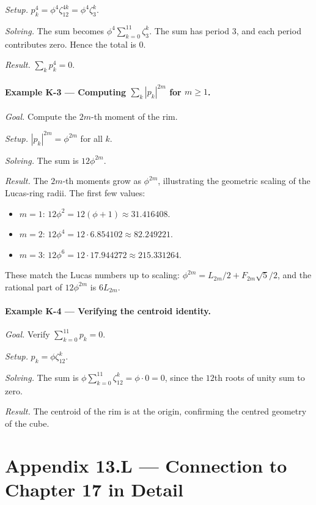\emph{Setup.} $p_{k}^{4} = \phi^{4} \zeta_{12}^{4k} = \phi^{4}
\zeta_{3}^{k}$.

\emph{Solving.} The sum becomes
$\phi^{4} \sum_{k=0}^{11} \zeta_{3}^{k}$. The sum has period $3$,
and each period contributes zero. Hence the total is $0$.

\emph{Result.} $\sum_{k} p_{k}^{4} = 0$.

\paragraph{Example K-3 --- Computing $\sum_{k} |p_{k}|^{2 m}$
for $m \geq 1$.}
\emph{Goal.} Compute the $2m$-th moment of the rim.

\emph{Setup.} $|p_{k}|^{2m} = \phi^{2m}$ for all $k$.

\emph{Solving.} The sum is $12 \phi^{2m}$.

\emph{Result.} The $2m$-th moments grow as $\phi^{2m}$, illustrating
the geometric scaling of the Lucas-ring radii. The first few
values:
\begin{itemize}
\item $m = 1$: $12 \phi^{2} = 12(\phi + 1) \approx 31.416408$.
\item $m = 2$: $12 \phi^{4} = 12 \cdot 6.854102 \approx 82.249221$.
\item $m = 3$: $12 \phi^{6} = 12 \cdot 17.944272 \approx 215.331264$.
\end{itemize}
These match the Lucas numbers up to scaling: $\phi^{2m} =
L_{2m}/2 + F_{2m}\sqrt{5}/2$, and the rational part of $12 \phi^{2m}$
is $6 L_{2m}$.

\paragraph{Example K-4 --- Verifying the centroid identity.}
\emph{Goal.} Verify $\sum_{k=0}^{11} p_{k} = 0$.

\emph{Setup.} $p_{k} = \phi \zeta_{12}^{k}$.

\emph{Solving.} The sum is $\phi \sum_{k=0}^{11} \zeta_{12}^{k} =
\phi \cdot 0 = 0$, since the $12$th roots of unity sum to zero.

\emph{Result.} The centroid of the rim is at the origin, confirming
the centred geometry of the cube.

\section*{Appendix 13.L --- Connection to Chapter 17 in Detail}
\label{fa_13:sec:13-appL}

